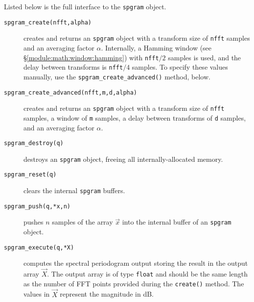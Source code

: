 %
Listed below is the full interface to the {\tt spgram} object.
%
\begin{description}
\item[{\tt spgram\_create(nfft,alpha)}]
    creates and returns an {\tt spgram} object with a transform size of
    {\tt nfft} samples and an averaging factor $\alpha$.
    Internally,
    a Hamming window (see \S\ref{module:math:window:hamming})
    with {\tt nfft}$/2$ samples is used,
    and the delay between transforms is {\tt nfft}$/4$ samples.
    To specify these values manually, use the
    {\tt spgram\_create\_advanced()} method, below.
\item[{\tt spgram\_create\_advanced(nfft,m,d,alpha)}]
    creates and returns an {\tt spgram} object with
    a transform size of {\tt nfft} samples,
    a window of {\tt m} samples,
    a delay between transforms of {\tt d} samples,
    and an averaging factor $\alpha$.
\item[{\tt spgram\_destroy(q)}]
    destroys an {\tt spgram} object, freeing all internally-allocated
    memory.
\item[{\tt spgram\_reset(q)}]
    clears the internal {\tt spgram} buffers.
\item[{\tt spgram\_push(q,*x,n)}]
    pushes $n$ samples of the array $\vec{x}$ into the internal buffer
    of an {\tt spgram} object.
\item[{\tt spgram\_execute(q,*X)}]
    computes the spectral periodogram output storing the result in the
    output array $\vec{X}$.
    The output array is of type {\tt float} and should be the
    same length as the number of FFT points provided during the
    {\tt create()} method.
    The values in $\vec{X}$ represent the magnitude in dB.
\end{description}

